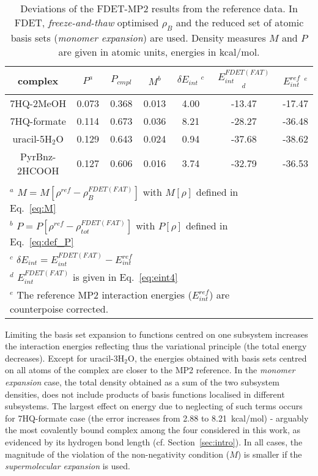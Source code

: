 \documentclass[journal=jctcce,manuscript=article]{achemso}
\newcommand{\nr}[1]{\color{red}#1\color{black}}
\begin{document}
\begin{table*}
{
\begin{center}
\begin{tabular}{|c|c|c|c|c|c|c|}
\hline
 complex & $P^a$ & $P_{cmpl}$ & $M^b$ & $\delta E_{int}\;^c$&$E^{FDET(FAT)}_{int}$ $^d$ &$E_{int}^{ref}$ $^e$ \\ \hline
7HQ-2MeOH & 0.073 & 0.368 & 0.013 & 4.00 & -13.47 & -17.47 \\ \hline
7HQ-formate & 0.114 & 0.673 & 0.036 &  8.21 & -28.27 & -36.48 \\ \hline
uracil-5H$_2$O & 0.129 & 0.643 & 0.024 & 0.94 & -37.68 & -38.62 \\ \hline
PyrBnz-2HCOOH  & 0.127 & 0.606 & 0.016  & 3.74 & -32.79 &  -36.53 \\ \hline
\multicolumn{6}{c}{ } \\
\multicolumn{6}{l}{$^a$ $M=M[\rho^{ref} - \rho^{FDET(FAT)}_{B}]$ with $M[\rho]$ defined in Eq.~\ref{eq:M}}\\
\multicolumn{6}{l}{$^b$ $P=P[\rho^{ref} - \rho_{tot}^{FDET(FAT)}]$ with $P[\rho]$ defined in Eq.~\ref{eq:def_P}}\\
\multicolumn{6}{l}{$^c$ $\delta E_{int}=E^{FDET(FAT)}_{int}-E_{int}^{ref}$} \\
\multicolumn{6}{l}{$^d$ $E^{FDET(FAT)}_{int}$ is given in Eq.~\ref{eq:eint4}}\\
\multicolumn{6}{l}{$^e$ The reference MP2 interaction energies ($E_{int}^{ref}$) are \nr{counterpoise } corrected.}
\end{tabular}
\end{center}
}%
\caption{Deviations of the FDET-MP2 results from the reference data.  In FDET, \textit{freeze-and-thaw} optimised $\rho_B$ and the reduced set of atomic basis sets ({\it monomer expansion}) are used. Density measures $M$ and $P$ are given in atomic units, energies in kcal/mol.
}
\label{table:ME_FAT}
\end{table*}

Limiting the basis set expansion to functions centred on one subsystem increases the interaction energies reflecting thus the variational principle (the total energy decreases). Except for uracil-3H$_2$O, the energies obtained with basis sets centred on all atoms of the complex are closer to the MP2 reference. In the {\it monomer expansion} case, the total density obtained as a sum of \nr{the } two subsystem densities, %
does not include products of basis function\nr{s } localised in different subsystems. The largest effect on energy due to neglecting of such terms occurs for 7HQ-formate case (the error increases from 2.88 to 8.21~kcal/mol) - arguably the most covalently bound complex among the four considered in this work\nr{, as evidenced by its hydrogen bond length (cf. Section~\ref{sec:intro})}. In all cases, the magnitude of the violation of the non-negativity condition ($M$)  is smaller if the {\it supermolecular expansion} is used. 
\end{document}
